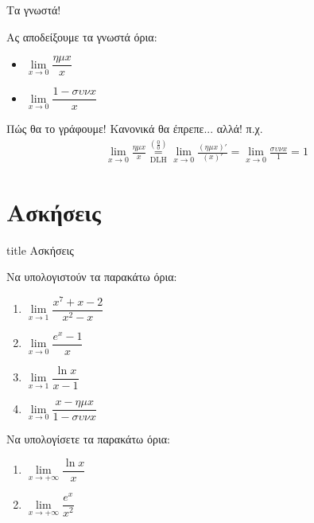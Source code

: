 \documentclass{presentation}
\begin{document}
\begin{frame}{Τα γνωστά!}

  Ας αποδείξουμε τα γνωστά όρια:

  \begin{itemize}[<+->]
    \item $\lim\limits_{x \to 0}{ \dfrac{ημx}{x} }$
    \item $\lim\limits_{x \to 0}{ \dfrac{1-συνx}{x} }$
  \end{itemize}

\end{frame}

\begin{frame}{Πώς θα το γράφουμε!}
  Κανονικά θα έπρεπε... αλλά! π.χ.
  \begin{align*}
    \lim\limits_{x \to 0}{ \frac{ημx}{x} }\underset{\text{DLH}}{\overset{\left( \frac{0}{0} \right) }{=}} \lim\limits_{x \to 0}{ \frac{(ημx)'}{(x)'} }=\lim\limits_{x \to 0}{ \frac{συνx}{1} }=1
  \end{align*}
\end{frame}

\section{Ασκήσεις}

\begin{frame}[noframenumbering]
  \vfill
  \centering
  \begin{beamercolorbox}[sep=8pt,center,shadow=true,rounded=true]{title}
    Ασκήσεις
  \end{beamercolorbox}
  \vfill
\end{frame}

\begin{askisi}
  Να υπολογιστούν τα παρακάτω όρια:
  \begin{enumerate}
    \item<1-> $\lim\limits_{x \to 1}{ \dfrac{x^7+x-2}{x^2-x} }$
    \item<2-> $\lim\limits_{x \to 0}{ \dfrac{e^x-1}{x} }$
    \item<3-> $\lim\limits_{x \to 1}{ \dfrac{\ln x}{x-1} }$
    \item<4-> $\lim\limits_{x \to 0}{ \dfrac{x-ημx}{1-συνx} }$
  \end{enumerate}

\end{askisi}

\begin{askisi}
  Να υπολογίσετε τα παρακάτω όρια:
  \begin{enumerate}
    \item<1-> $\lim\limits_{x \to +\infty}{ \dfrac{\ln x}{x} }$
    \item<2-> $\lim\limits_{x \to +\infty}{ \dfrac{e^x}{x^2} }$
  \end{enumerate}

\end{askisi}
\end{document}
